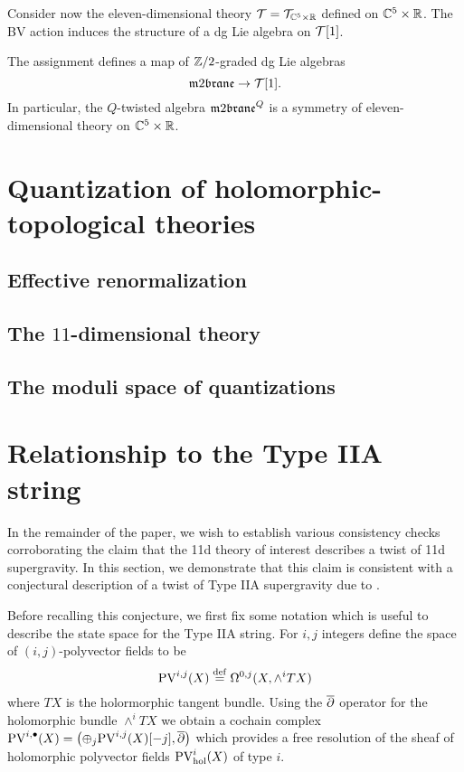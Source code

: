 \documentclass[11pt]{amsart}
\def\pv{{\rm PV}}
\def\PV{{\rm PV}}
\begin{document}
Consider now the eleven-dimensional theory $\mathcal T = \mathcal T_{\mathbb C^5 \times \mathbb R}$ defined on $\mathbb C^5 \times \mathbb R$. 
The BV action induces the structure of a dg Lie algebra on $\mathcal T[1]$. 

\begin{prop}
The assignment
 defines a map of $\mathbb Z/2$-graded dg Lie algebras 
\[
\m2 \to \cT[1] .
\]
In particular, the $Q$-twisted algebra $\m2^Q$ is a symmetry of eleven-dimensional theory on $\mathbb C^5 \times \mathbb R$. 
\end{prop}


\section{Quantization of holomorphic-topological theories}
\label{sec:org297a559}
\subsection{Effective renormalization}
\label{sec:orga5cd4ed}
\subsection{The \(11\)-dimensional theory}
\label{sec:org8b189fc}
\subsection{The moduli space of quantizations}
\label{sec:orgf278b4e}
\section{Relationship to the Type IIA string}
\label{sec:org355a726}
In the remainder of the paper, we wish to establish various consistency checks corroborating the claim that the 11d theory of interest describes a twist of 11d supergravity. In this section, we demonstrate that this claim is consistent with a conjectural description of a twist of Type IIA supergravity due to \cite{CLsugra}.

Before recalling this conjecture, we first fix some notation which is useful to describe the state space for the Type IIA string. 
For $i,j$ integers define the space of $(i,j)$-polyvector fields to be
\[
  \pv^{i,j}(X) \define \Omega^{0,j}(X, \wedge^{i} TX)
\]
where $TX$ is the holormorphic tangent bundle.
Using the $\overline{\partial}$ operator for the holomorphic bundle $\wedge^{i}TX$ we obtain a cochain complex $\pv^{i,\bu}(X) = \left(\oplus_{j} \pv^{i,j}(X) [-j], \dbar \right)$ which provides a free resolution of the sheaf of holomorphic polyvector fields $\PV^{i}_{\rm hol}(X)$ of type $i$.
\end{document}
